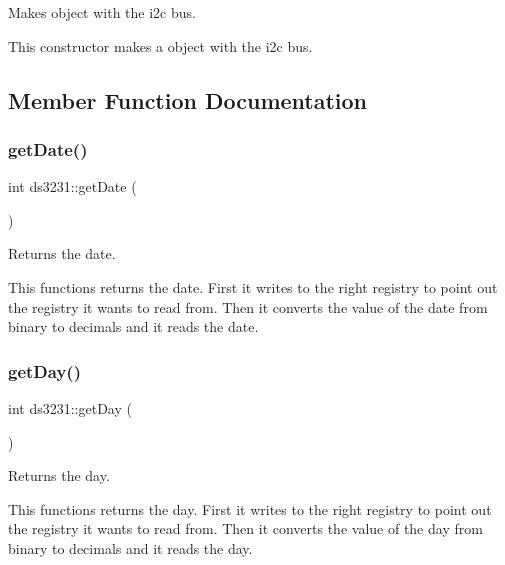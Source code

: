 Makes object with the i2c bus. 

This constructor makes a object with the i2c bus. 

\subsection{Member Function Documentation}
\mbox{\label{classds3231_a37b8905a4661c6961b006b339e22ac4a}} 
\subsubsection{\texorpdfstring{get\+Date()}{getDate()}}
{\footnotesize\ttfamily int ds3231\+::get\+Date (\begin{DoxyParamCaption}{ }\end{DoxyParamCaption})\hspace{0.3cm}{\ttfamily [inline]}}



Returns the date. 

This functions returns the date. First it writes to the right registry to point out the registry it wants to read from. Then it converts the value of the date from binary to decimals and it reads the date. \mbox{\label{classds3231_a8a2bdd6773998e3dc0799f6389ab11ef}} 
\subsubsection{\texorpdfstring{get\+Day()}{getDay()}}
{\footnotesize\ttfamily int ds3231\+::get\+Day (\begin{DoxyParamCaption}{ }\end{DoxyParamCaption})\hspace{0.3cm}{\ttfamily [inline]}}



Returns the day. 

This functions returns the day. First it writes to the right registry to point out the registry it wants to read from. Then it converts the value of the day from binary to decimals and it reads the day. \mbox{\label{classds3231_a711ac9181f3012073fdc82a57493340b}} 
